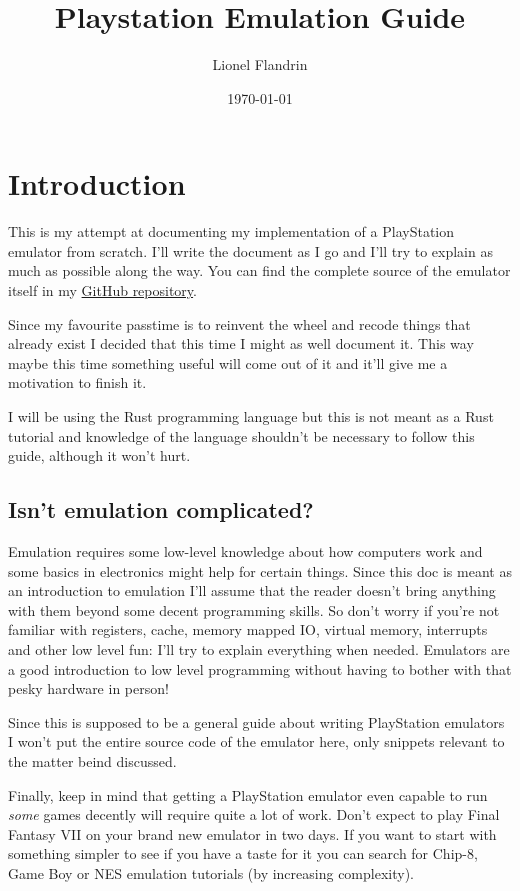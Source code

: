 \documentclass[a4paper]{article}
\title{Playstation Emulation Guide}
\date{\today}
\author{Lionel Flandrin}
\begin{document}
\maketitle
\newpage
\tableofcontents
\newpage

\section{Introduction}

This is my attempt at documenting my implementation of a PlayStation
emulator from scratch. I'll write the document as I go and I'll try to
explain as much as possible along the way. You can find the complete
source of the emulator itself in my
\href{https://github.com/simias/psx-rs}{GitHub repository}.

Since my favourite passtime is to reinvent the wheel and recode things
that already exist I decided that this time I might as well document
it. This way maybe this time something useful will come out of it and
it'll give me a motivation to finish it.

I will be using the Rust programming language but this is not meant as
a Rust tutorial and knowledge of the language shouldn't be necessary
to follow this guide, although it won't hurt.

\subsection{Isn't emulation complicated?}

Emulation requires some low-level knowledge about how computers work
and some basics in electronics might help for certain things. Since
this doc is meant as an introduction to emulation I'll assume that the
reader doesn't bring anything with them beyond some decent programming
skills. So don't worry if you're not familiar with registers, cache,
memory mapped IO, virtual memory, interrupts and other low level fun:
I'll try to explain everything when needed. Emulators are a good
introduction to low level programming without having to bother with
that pesky hardware in person!

Since this is supposed to be a general guide about writing PlayStation
emulators I won't put the entire source code of the emulator here,
only snippets relevant to the matter beind discussed.

Finally, keep in mind that getting a PlayStation emulator even capable
to run \emph{some} games decently will require quite a lot of work. Don't
expect to play Final Fantasy VII on your brand new emulator in two
days. If you want to start with something simpler to see if you have a
taste for it you can search for Chip-8, Game Boy or NES emulation
tutorials (by increasing complexity).
\end{document}
